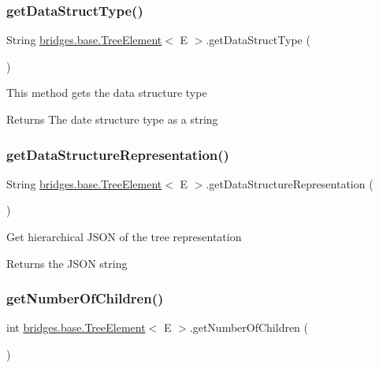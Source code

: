 \subsubsection{\texorpdfstring{get\+Data\+Struct\+Type()}{getDataStructType()}}
{\footnotesize\ttfamily String \mbox{\hyperlink{classbridges_1_1base_1_1_tree_element}{bridges.\+base.\+Tree\+Element}}$<$ E $>$.get\+Data\+Struct\+Type (\begin{DoxyParamCaption}{ }\end{DoxyParamCaption})}

This method gets the data structure type

\begin{DoxyReturn}{Returns}
The date structure type as a string 
\end{DoxyReturn}
\mbox{\label{classbridges_1_1base_1_1_tree_element_a674870c91b39fac88d35a569fd505e9b}} 
\subsubsection{\texorpdfstring{get\+Data\+Structure\+Representation()}{getDataStructureRepresentation()}}
{\footnotesize\ttfamily String \mbox{\hyperlink{classbridges_1_1base_1_1_tree_element}{bridges.\+base.\+Tree\+Element}}$<$ E $>$.get\+Data\+Structure\+Representation (\begin{DoxyParamCaption}{ }\end{DoxyParamCaption})}

Get hierarchical J\+S\+ON of the tree representation

\begin{DoxyReturn}{Returns}
the J\+S\+ON string 
\end{DoxyReturn}
\mbox{\label{classbridges_1_1base_1_1_tree_element_a3722c7cec66ff297f999870df0da3cff}} 
\subsubsection{\texorpdfstring{get\+Number\+Of\+Children()}{getNumberOfChildren()}}
{\footnotesize\ttfamily int \mbox{\hyperlink{classbridges_1_1base_1_1_tree_element}{bridges.\+base.\+Tree\+Element}}$<$ E $>$.get\+Number\+Of\+Children (\begin{DoxyParamCaption}{ }\end{DoxyParamCaption})}

